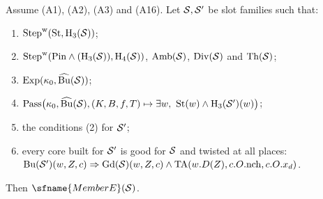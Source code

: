 \begin{theorem}\label{pf:baselat1:steps2}
Assume (A1), (A2), (A3) and
(A16). Let $\mathcal S,\mathcal S'$ be slot families such that:
\begin{enumerate}[label=(\arabic*)]
\item $\mathrm{Step}^{\mathrm w}(\mathrm{St},\mathrm{H}_3(\mathcal S))$;
\item $\mathrm{Step}^{\mathrm w}(\mathrm{Pin}\wedge(\mathrm{H}_3(\mathcal S)),\mathrm{H}_4(\mathcal S))$,
  $\mathrm{Amb}(\mathcal S)$, $\mathrm{Div}(\mathcal S)$ and $\mathrm{Th}(\mathcal S)$;
\item $\mathrm{Exp}(\kappa_0,\widehat{\mathrm{Bu}}(\mathcal S))$;
\item $\mathrm{Pass}\bigl(\kappa_0,\widehat{\mathrm{Bu}}(\mathcal S),(K,B,f,T)\mapsto\exists w,\
  \mathrm{St}(w)\wedge\mathrm{H}_3(\mathcal S')(w)\bigr)$;
\item the conditions (2) for $\mathcal S'$;
\item every core built for $\mathcal S'$ is good for $\mathcal S$ and twisted at all places:
  $\mathrm{Bu}(\mathcal S')(w,Z,c)\Rightarrow\mathrm{Gd}(\mathcal S)(w,Z,c)\wedge
  \mathrm{TA}(w.D(Z),c.O.\mathrm{nch},c.O.x_d)$.
\end{enumerate}
Then $\sfname{MemberE}(\baselatoneS)$.
\end{theorem}

